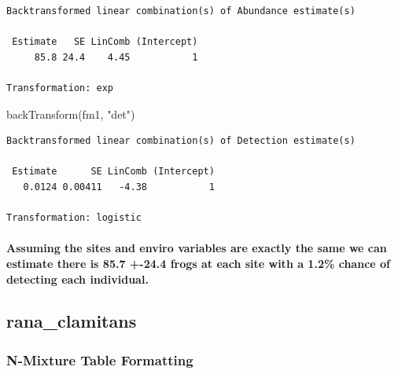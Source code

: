 \documentclass[
  letterpaper,
  DIV=11,
  numbers=noendperiod]{scrartcl}
\let\oldparagraph\paragraph
\renewcommand{\paragraph}[1]{\oldparagraph{#1}\mbox{}}
\newenvironment{Shaded}{\begin{snugshade}}{\end{snugshade}}
\newcommand{\FunctionTok}[1]{\textcolor[rgb]{0.28,0.35,0.67}{#1}}
\newcommand{\NormalTok}[1]{\textcolor[rgb]{0.00,0.23,0.31}{#1}}
\newcommand{\StringTok}[1]{\textcolor[rgb]{0.13,0.47,0.30}{#1}}
\begin{document}
\begin{verbatim}
Backtransformed linear combination(s) of Abundance estimate(s)

 Estimate   SE LinComb (Intercept)
     85.8 24.4    4.45           1

Transformation: exp 
\end{verbatim}

\begin{Shaded}
\begin{Highlighting}[]
\FunctionTok{backTransform}\NormalTok{(fm1, }\StringTok{"det"}\NormalTok{)}
\end{Highlighting}
\end{Shaded}

\begin{verbatim}
Backtransformed linear combination(s) of Detection estimate(s)

 Estimate      SE LinComb (Intercept)
   0.0124 0.00411   -4.38           1

Transformation: logistic 
\end{verbatim}

\hypertarget{assuming-the-sites-and-enviro-variables-are-exactly-the-same-we-can-estimate-there-is-85.7--24.4-frogs-at-each-site-with-a-1.2-chance-of-detecting-each-individual.}{%
\paragraph{Assuming the sites and enviro variables are exactly the same
we can estimate there is 85.7 +-24.4 frogs at each site with a 1.2\%
chance of detecting each
individual.}\label{assuming-the-sites-and-enviro-variables-are-exactly-the-same-we-can-estimate-there-is-85.7--24.4-frogs-at-each-site-with-a-1.2-chance-of-detecting-each-individual.}}

\newpage

\hypertarget{rana_clamitans}{%
\subsection{rana\_clamitans}\label{rana_clamitans}}

\hypertarget{n-mixture-table-formatting-2}{%
\subsubsection{N-Mixture Table
Formatting}\label{n-mixture-table-formatting-2}}
\end{document}
